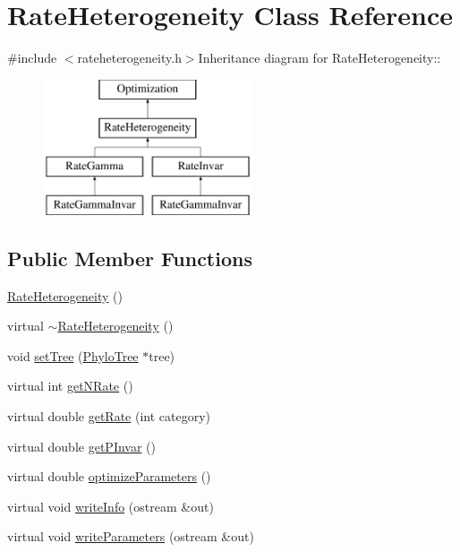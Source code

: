 \hypertarget{classRateHeterogeneity}{
\section{RateHeterogeneity Class Reference}
\label{classRateHeterogeneity}
}


{\ttfamily \#include $<$rateheterogeneity.h$>$}Inheritance diagram for RateHeterogeneity::\begin{figure}[H]
\begin{center}
\leavevmode
\includegraphics[height=4cm]{classRateHeterogeneity}
\end{center}
\end{figure}
\subsection*{Public Member Functions}
\begin{DoxyCompactItemize}
\item 
\hyperlink{classRateHeterogeneity_a9a1e70b493cfd7ce53bfbce242bbcb46}{RateHeterogeneity} ()
\item 
virtual \hyperlink{classRateHeterogeneity_a695587b35c973b88c6d669dd00ffd791}{$\sim$RateHeterogeneity} ()
\item 
void \hyperlink{classRateHeterogeneity_a5333e4d51b14b79dbaa32df641891cbb}{setTree} (\hyperlink{classPhyloTree}{PhyloTree} $\ast$tree)
\item 
virtual int \hyperlink{classRateHeterogeneity_ac61808650eab5d2187f3cc9b20694f80}{getNRate} ()
\item 
virtual double \hyperlink{classRateHeterogeneity_a87546419c324a62d31055d564ea07f5e}{getRate} (int category)
\item 
virtual double \hyperlink{classRateHeterogeneity_ada76d84ed7f66ddde02734d9c72f4e7b}{getPInvar} ()
\item 
virtual double \hyperlink{classRateHeterogeneity_a1305d5b8481dd5a2482917ddb5fe57bd}{optimizeParameters} ()
\item 
virtual void \hyperlink{classRateHeterogeneity_a520772859d465036b6620bdbf2977efe}{writeInfo} (ostream \&out)
\item 
virtual void \hyperlink{classRateHeterogeneity_ad2832e686971cf1f2cac2a6f842a3550}{writeParameters} (ostream \&out)
\end{DoxyCompactItemize}
